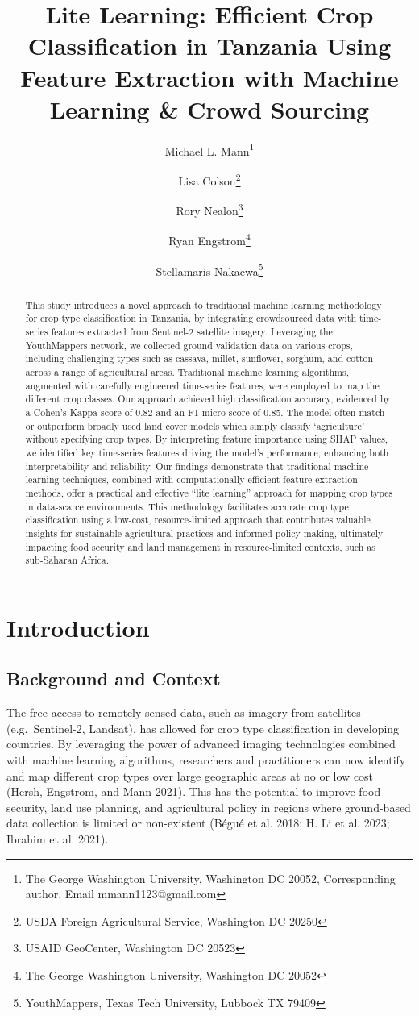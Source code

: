 \documentclass[
  journal,
  twocolumn]{IEEEtran}
\title{Lite Learning: Efficient Crop Classification in Tanzania Using
Feature Extraction with Machine Learning \& Crowd Sourcing}
\author{
Michael L. Mann\thanks{The George Washington University, Washington DC
20052, Corresponding author. Email mmann1123@gmail.com} \and 
Lisa Colson\thanks{USDA Foreign Agricultural Service, Washington DC
20250} \and 
Rory Nealon\thanks{USAID GeoCenter, Washington DC 20523} \and 
Ryan Engstrom\thanks{The George Washington University, Washington DC
20052} \and 
Stellamaris Nakacwa\thanks{YouthMappers, Texas Tech University, Lubbock
TX 79409}}
\date{}
\begin{document}
\maketitle
\begin{abstract}
This study introduces a novel approach to traditional machine learning
methodology for crop type classification in Tanzania, by integrating
crowdsourced data with time-series features extracted from Sentinel-2
satellite imagery. Leveraging the YouthMappers network, we collected
ground validation data on various crops, including challenging types
such as cassava, millet, sunflower, sorghum, and cotton across a range
of agricultural areas. Traditional machine learning algorithms,
augmented with carefully engineered time-series features, were employed
to map the different crop classes. Our approach achieved high
classification accuracy, evidenced by a Cohen's Kappa score of 0.82 and
an F1-micro score of 0.85. The model often match or outperform broadly
used land cover models which simply classify `agriculture' without
specifying crop types. By interpreting feature importance using SHAP
values, we identified key time-series features driving the model's
performance, enhancing both interpretability and reliability. Our
findings demonstrate that traditional machine learning techniques,
combined with computationally efficient feature extraction methods,
offer a practical and effective ``lite learning'' approach for mapping
crop types in data-scarce environments. This methodology facilitates
accurate crop type classification using a low-cost, resource-limited
approach that contributes valuable insights for sustainable agricultural
practices and informed policy-making, ultimately impacting food security
and land management in resource-limited contexts, such as sub-Saharan
Africa.
\end{abstract}

\hypertarget{introduction}{%
\section{Introduction}\label{introduction}}

\hypertarget{background-and-context}{%
\subsection{Background and Context}\label{background-and-context}}

The free access to remotely sensed data, such as imagery from satellites
(e.g.~Sentinel-2, Landsat), has allowed for crop type classification in
developing countries. By leveraging the power of advanced imaging
technologies combined with machine learning algorithms, researchers and
practitioners can now identify and map different crop types over large
geographic areas at no or low cost (Hersh, Engstrom, and Mann 2021).
This has the potential to improve food security, land use planning, and
agricultural policy in regions where ground-based data collection is
limited or non-existent (Bégué et al. 2018; H. Li et al. 2023; Ibrahim
et al. 2021).
\end{document}
